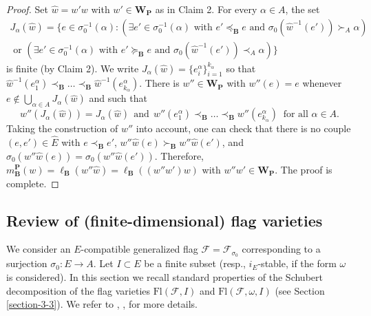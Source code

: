 \documentclass[12pt]{amsart}
\theoremstyle{definition}
\begin{document}
\begin{proof}
\smallskip

Set $\hat{w}=w'w$ with $w'\in\mathbf{W}_\mathbf{P}$ as in Claim 2.
For every $\alpha\in A$, the set
\begin{eqnarray*}
J_\alpha(\hat{w})=\{e\in\sigma_0^{-1}(\alpha):(\exists e'\in\sigma_0^{-1}(\alpha)\mbox{ with }e'\preceq_\mathbf{B}e\mbox{ and }\sigma_0(\hat{w}^{-1}(e'))\succ_A\alpha) \\ \mbox{ or }(\exists e'\in\sigma_0^{-1}(\alpha)\mbox{ with }e'\succeq_\mathbf{B}e\mbox{ and }\sigma_0(\hat{w}^{-1}(e'))\prec_A\alpha)\}
\end{eqnarray*}
is finite (by Claim 2). We write $J_\alpha(\hat{w})=\{e_i^\alpha\}_{i=1}^{k_\alpha}$
so that $\hat{w}^{-1}(e_1^\alpha)\prec_\mathbf{B}\ldots\prec_\mathbf{B}\hat{w}^{-1}(e_{k_\alpha}^\alpha)$.
There is $w''\in\mathbf{W}_\mathbf{P}$ with $w''(e)=e$ whenever $e\notin\bigcup_{\alpha\in A}J_\alpha(\hat{w})$ and such that
\[w''(J_\alpha(\hat{w}))=J_\alpha(\hat{w})\ \ \mbox{and}\ \ w''(e_1^\alpha)\prec_\mathbf{B}\ldots\prec_\mathbf{B}w''(e_{k_\alpha}^\alpha)\ \mbox{ for all $\alpha\in A$.}\]
Taking the construction of $w''$ into account, one can check that there is no couple $(e,e')\in\hat{E}$ with $e\prec_\mathbf{B}e'$, $w''\hat{w}(e)\succ_\mathbf{B}w''\hat{w}(e')$, and $\sigma_0(w''\hat{w}(e))=\sigma_0(w''\hat{w}(e'))$. Therefore, $m_\mathbf{B}^\mathbf{P}(w)=\ell_\mathbf{B}(w''\hat{w})=\ell_\mathbf{B}((w''w')w)$ with $w''w'\in\mathbf{W}_\mathbf{P}$. The proof is complete.
\end{proof}

\subsection{Review of (finite-dimensional) flag varieties}
\label{section-5-2}
We consider an $E$-compatible generalized flag $\mathcal{F}=\mathcal{F}_{\sigma_0}$
corresponding to a surjection $\sigma_0:E\to A$. Let $I\subset E$ be a finite subset (resp., $i_E$-stable, if the form $\omega$ is considered).
In this section we recall standard properties of the Schubert decomposition of the flag varieties $\mathrm{Fl}(\mathcal{F},I)$ and $\mathrm{Fl}(\mathcal{F},\omega,I)$ (see Section \ref{section-3-3}). We refer to \cite[\S 3.2--3.5]{Billey-Lakshmibai}, \cite[\S 1.2]{Brion}, \cite[\S 10.8]{Lak-book} for more details.
\end{document}

